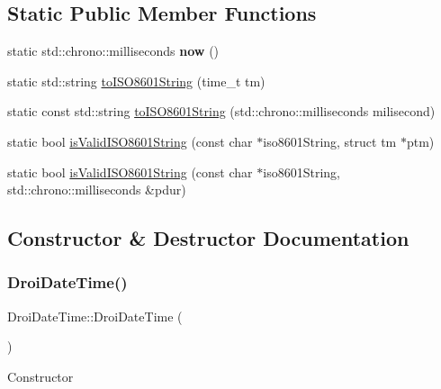 \subsection*{Static Public Member Functions}
\begin{DoxyCompactItemize}
\item 
\mbox{\label{class_droi_date_time_a0e951df9a0b39db09bb21dabdaed417f}} 
static std\+::chrono\+::milliseconds {\bfseries now} ()
\item 
static std\+::string \hyperlink{class_droi_date_time_ad77372692061dd8c396b09ce7544d168}{to\+I\+S\+O8601\+String} (time\+\_\+t tm)
\item 
static const std\+::string \hyperlink{class_droi_date_time_a9adddae64481892a0d413f36b20375d3}{to\+I\+S\+O8601\+String} (std\+::chrono\+::milliseconds milisecond)
\item 
static bool \hyperlink{class_droi_date_time_a49d981c3055e4bd519e5b3333cd21d7a}{is\+Valid\+I\+S\+O8601\+String} (const char $\ast$iso8601\+String, struct tm $\ast$ptm)
\item 
static bool \hyperlink{class_droi_date_time_ac4dfd56ef368d601d228992f0902a357}{is\+Valid\+I\+S\+O8601\+String} (const char $\ast$iso8601\+String, std\+::chrono\+::milliseconds \&pdur)
\end{DoxyCompactItemize}


\subsection{Constructor \& Destructor Documentation}
\mbox{\label{class_droi_date_time_ab9363f1db1a719280e9efb26a04d2f3d}} 
\subsubsection{\texorpdfstring{Droi\+Date\+Time()}{DroiDateTime()}\hspace{0.1cm}{\footnotesize\ttfamily [1/3]}}
{\footnotesize\ttfamily Droi\+Date\+Time\+::\+Droi\+Date\+Time (\begin{DoxyParamCaption}{ }\end{DoxyParamCaption})}

Constructor \mbox{\label{class_droi_date_time_ad94e01e84b3805bf9ecfb45181bb8352}} 
